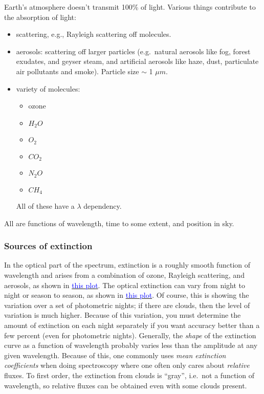 \documentclass[12pt]{article}
\begin{document}
Earth's atmosphere doesn't transmit 100\% of light. Various things
contribute to the absorption of light:
\begin{itemize}
    \item scattering, e.g., Rayleigh scattering off molecules.
    \item aerosols: scattering off larger particles (e.g.\ natural
    aerosols like fog, forest exudates, and geyser steam, and
    artificial aerosols like haze, dust, particulate air pollutants
    and smoke). Particle size $\sim$ 1 $\mu m$.
    \item variety of molecules:
    \begin{itemize}
        \item ozone
        \item $H_2O$
        \item $O_2$
        \item $CO_2$
        \item $N_2O$
        \item $CH_4$
    \end{itemize}
    All of these have a $\lambda$ dependency.
\end{itemize}
All are functions of wavelength, time to some extent, and position in
sky.

\subsubsection*{Sources of extinction}
In the optical part of the spectrum, extinction is a roughly smooth
function of wavelength and arises from a combination of ozone,
Rayleigh scattering, and aerosols, as shown in
\href{http://astronomy.nmsu.edu/holtz/a535/html/diagrams/a535/extinct.htm}
{\textcolor{blue}{this plot}}.
The optical extinction can vary from night to night
or season to season, as shown in
\href{http://astronomy.nmsu.edu/holtz/a535/html/diagrams/a535/tauvar.htm}
{\textcolor{blue}{this plot}}.
Of course, this is showing the variation over a set of
photometric nights; if there are clouds, then the level of variation
is much higher. Because of this variation, you must determine the
amount of extinction on each night separately if you want accuracy
better than a few percent (even for photometric nights). Generally,
the \emph{shape} of the extinction curve as a function of wavelength probably
varies less than the amplitude at any given wavelength. Because of
this, one commonly uses \emph{mean extinction coefficients} when doing
spectroscopy where one often only cares about \emph{relative} fluxes. To
first order, the extinction from clouds is ``gray'', i.e.\ not a
function of wavelength, so relative fluxes can be obtained even with
some clouds present.
\end{document}
